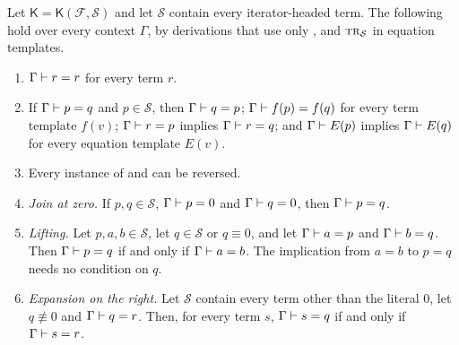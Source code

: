 \begin{lemma}
\label{guard:lem:safe}
Let $\mathsf K=\mathsf K(\mathcal F,\mathcal S)$ and let $\mathcal S$ contain
every iterator-headed term.  The following hold over every context $\Gamma$,
by derivations that use only ,  and
$\rulename{Tr}_{\mathcal S}$ in equation templates.
\begin{enumerate}[label=\textup{(\roman*)}]
\item $\Gamma\vdash r=r$ for every term $r$.
\item If $\Gamma\vdash p=q$ and $p\in\mathcal S$, then $\Gamma\vdash q=p$;
 $\Gamma\vdash f(p)=f(q)$ for every term template $f(v)$;
 $\Gamma\vdash r=p$ implies $\Gamma\vdash r=q$; and $\Gamma\vdash E(p)$
 implies $\Gamma\vdash E(q)$ for every equation template $E(v)$.
\item Every instance of  and  can be reversed.
\item \emph{Join at zero.}  If $p,q\in\mathcal S$, $\Gamma\vdash p=0$ and
 $\Gamma\vdash q=0$, then $\Gamma\vdash p=q$.
\item \emph{Lifting.}  Let $p,a,b\in\mathcal S$, let $q\in\mathcal S$ or
 $q\equiv 0$, and let $\Gamma\vdash a=p$ and $\Gamma\vdash b=q$.  Then
 $\Gamma\vdash p=q$ if and only if $\Gamma\vdash a=b$.  The implication
 from $a=b$ to $p=q$ needs no condition on $q$.
\item \emph{Expansion on the right.}  Let $\mathcal S$ contain every term
 other than the literal $0$, let $q\not\equiv 0$ and $\Gamma\vdash q=r$.
 Then, for every term $s$, $\Gamma\vdash s=q$ if and only if
 $\Gamma\vdash s=r$.
\end{enumerate}
\end{lemma}

